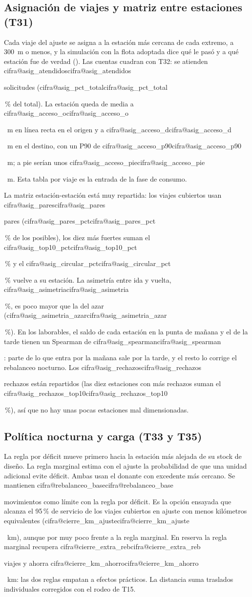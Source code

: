 \documentclass[11pt,a4paper]{article}
\makeatletter
\newcommand\cifra[1]{\ifcsname cifra@#1\endcsname\csname cifra@#1\endcsname
  \else\PackageError{memoria}{Cifra desconocida: \detokenize{#1}}{Revisa generar_cifras.py}\fi}
\newcommand\pc{\,\%}
\makeatother
\begin{document}
\subsection{Asignación de viajes y matriz entre estaciones (T31)}
Cada viaje del ajuste se asigna a la estación más cercana de cada extremo, a 300~m o menos,
y la simulación con la flota adoptada dice qué le pasó y a qué estación fue de verdad
(). Las cuentas cuadran con T32: se atienden
\cifra{asig_atendidos} solicitudes (\cifra{asig_pct_total}\pc{} del total). La estación
queda de media a \cifra{asig_acceso_o}~m en línea recta en el origen y a
\cifra{asig_acceso_d}~m en el destino, con un P90 de \cifra{asig_acceso_p90}~m; a pie serían
unos \cifra{asig_acceso_pie}~m. Esta tabla por viaje es la entrada de la fase de consumo.

La matriz estación-estación está muy repartida: los viajes cubiertos usan
\cifra{asig_pares} pares (\cifra{asig_pares_pct}\pc{} de los posibles), los diez más
fuertes suman el \cifra{asig_top10_pct}\pc{} y el \cifra{asig_circular_pct}\pc{} vuelve a
su estación. La asimetría entre ida y vuelta, \cifra{asig_asimetria}\pc{}, es poco mayor que
la del azar (\cifra{asig_asimetria_azar}\pc{}). En los laborables, el saldo de cada estación
en la punta de mañana y el de la tarde tienen un Spearman de \cifra{asig_spearman}: parte de
lo que entra por la mañana sale por la tarde, y el resto lo corrige el rebalanceo nocturno.
Los \cifra{asig_rechazos} rechazos están repartidos (las diez estaciones con más rechazos
suman el \cifra{asig_rechazos_top10}\pc{}), así que no hay unas pocas estaciones mal
dimensionadas.

\subsection{Política nocturna y carga (T33 y T35)}
La regla por déficit mueve primero hacia la estación más alejada de su stock
de diseño. La regla marginal estima con el ajuste la probabilidad de que una
unidad adicional evite déficit. Ambas usan el donante con excedente más cercano.
Se mantienen \cifra{rebalanceo_base} movimientos como límite con la regla por
déficit. Es la opción ensayada que alcanza el 95\pc{} de servicio de los
viajes cubiertos en ajuste con menos kilómetros equivalentes
(\cifra{cierre_km_ajuste}~km), aunque por muy poco frente a la regla marginal.
En reserva la regla marginal recupera \cifra{cierre_extra_reb} viajes y ahorra
\cifra{cierre_km_ahorro}~km: las dos reglas empatan a efectos prácticos.
La distancia suma traslados individuales corregidos con el rodeo de T15.
\end{document}
